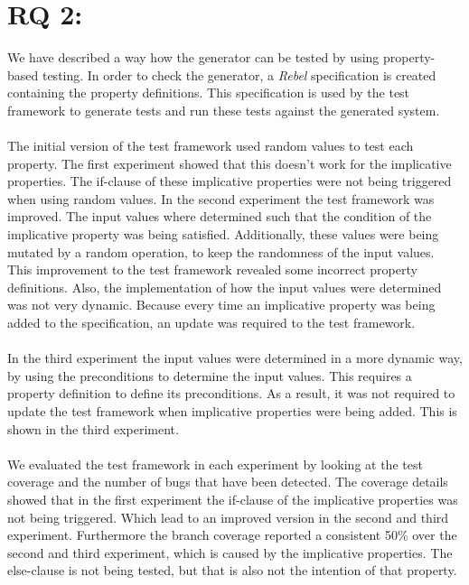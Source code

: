 \section{RQ 2: \rqTwo{}}
We have described a way how the generator can be tested by using property-based
testing. In order to check the generator, a \textit{Rebel} specification is
created containing the property definitions. This specification is used by
the test framework to generate tests and run these tests against the generated
system.\\
\\
The initial version of the test framework used random values to test each property. The first experiment showed that this doesn't work for the implicative properties. The if-clause of these implicative properties were not being triggered when using random values. In the second experiment the test framework was improved. The input values where determined such that the condition of the implicative property was being satisfied. Additionally, these values were being mutated by a random operation, to keep the randomness of the input values. This improvement to the test framework revealed some incorrect property definitions. Also, the implementation of how the input values were determined was not very dynamic. Because every time an implicative property was being added to the specification, an update was required to the test framework.\\
\\
In the third experiment the input values were determined in a more dynamic way, by using the preconditions to determine the input values. This requires a property definition to define its preconditions. As a result, it was not required to update the test framework when implicative properties were being added. This is shown in the third experiment.\\
\\
We evaluated the test framework in each experiment by looking at the test coverage and the number of bugs that have been detected. The coverage details showed that in the first experiment the if-clause of the implicative properties was not being triggered. Which lead to an improved version in the second and third experiment. Furthermore the branch coverage reported a consistent 50\% over the second and third experiment, which is caused by the implicative properties. The else-clause is not being tested, but that is also not the intention of that property.\\

